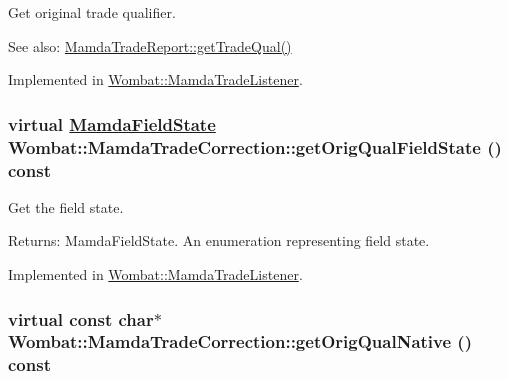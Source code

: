 Get original trade qualifier. 

\begin{Desc}
\item[See also:]\hyperlink{classWombat_1_1MamdaTradeReport_01f6e34bc27e4c6a9d2262327c2961d7}{Mamda\-Trade\-Report::get\-Trade\-Qual()} \end{Desc}


Implemented in \hyperlink{classWombat_1_1MamdaTradeListener_65563a27266a0f48eff3f44b5a4216b7}{Wombat::Mamda\-Trade\-Listener}.\hypertarget{classWombat_1_1MamdaTradeCorrection_c197a0361fdc66023e813926ad7c950c}{
\subsubsection[getOrigQualFieldState]{\setlength{\rightskip}{0pt plus 5cm}virtual \hyperlink{namespaceWombat_93aac974f2ab713554fd12a1fa3b7d2a}{Mamda\-Field\-State} Wombat::Mamda\-Trade\-Correction::get\-Orig\-Qual\-Field\-State () const}}
\label{classWombat_1_1MamdaTradeCorrection_c197a0361fdc66023e813926ad7c950c}


Get the field state. 

\begin{Desc}
\item[Returns:]Mamda\-Field\-State. An enumeration representing field state. \end{Desc}


Implemented in \hyperlink{classWombat_1_1MamdaTradeListener_04acb5179a6d640a0a54fd30df321b85}{Wombat::Mamda\-Trade\-Listener}.\hypertarget{classWombat_1_1MamdaTradeCorrection_f75ee18edce1de13881f96c558f06b68}{
\subsubsection[getOrigQualNative]{\setlength{\rightskip}{0pt plus 5cm}virtual const char$\ast$ Wombat::Mamda\-Trade\-Correction::get\-Orig\-Qual\-Native () const}}
\label{classWombat_1_1MamdaTradeCorrection_f75ee18edce1de13881f96c558f06b68}


